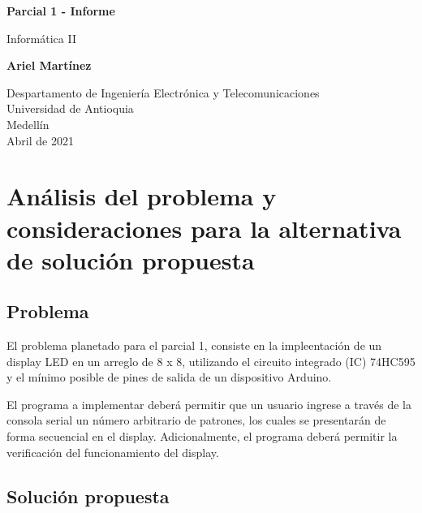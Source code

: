\documentclass{article}
\begin{document}
\begin{titlepage}
    \begin{center}
        \vspace*{1cm}
            
        \Huge
        \textbf{Parcial 1 - Informe}
            
        \vspace{0.5cm}
        \LARGE
        Informática II
            
        \vspace{1.5cm}
            
        \textbf{Ariel Martínez}
            
        \vfill
            
        \vspace{0.8cm}
            
        \Large
        Despartamento de Ingeniería Electrónica y Telecomunicaciones\\
        Universidad de Antioquia\\
        Medellín\\
        Abril de 2021
            
    \end{center}
\end{titlepage}

\tableofcontents
\newpage
\section{Análisis del problema y consideraciones para la alternativa de solución propuesta}\label{analisis}

\subsection{Problema}

El problema planetado para el parcial 1, consiste en la impleentación de un display LED en un arreglo de 8 x 8, utilizando el circuito integrado (IC) 74HC595 y el mínimo posible de pines de salida de un dispositivo Arduino.

El programa a implementar deberá permitir que un usuario ingrese a través de la consola serial un número arbitrario de patrones, los cuales se presentarán de forma secuencial en el display. Adicionalmente, el programa deberá permitir la verificación del funcionamiento del display.

\subsection{Solución propuesta}
\end{document}
